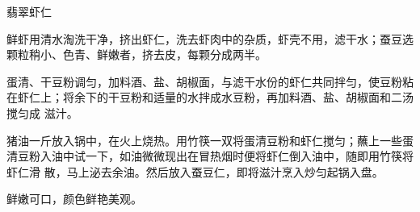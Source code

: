 \begin{recipe}{翡翠虾仁}

\ingredients


\preparation

\step 鲜虾用清水淘洗干净，挤出虾仁，洗去虾肉中的杂质，虾壳不用，滤干水；蚕豆选
颗粒稍小、色青、鲜嫩者，挤去皮，每颗分成两半。

\step 蛋清、干豆粉调匀，加料酒、盐、胡椒面，与滤干水份的虾仁共同拌匀，使豆粉粘
在虾仁上；将余下的干豆粉和适量的水拌成水豆粉，再加料酒、盐、胡椒面和二汤搅匀成
滋汁。

\step 猪油一斤放入锅中，在火上烧热。用竹筷一双将蛋清豆粉和虾仁搅匀；蘸上一些蛋
清豆粉入油中试一下，如油微微现出在冒热烟时便将虾仁倒入油中，随即用竹筷将虾仁滑
散，马上泌去余油。然后放入蚕豆仁，即将滋汁烹入炒匀起锅入盘。

\features

鲜嫩可口，颜色鲜艳美观。

\end{recipe}

